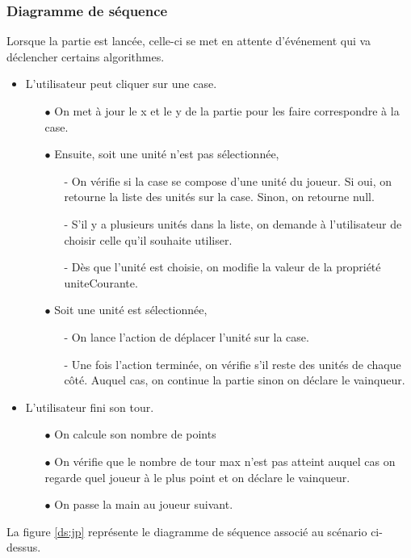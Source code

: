 \documentclass[a4paper,11pt]{article}
\begin{document}
\subsubsection{Diagramme de séquence}
Lorsque la partie est lancée, celle-ci se met en attente d'événement qui va déclencher certains algorithmes.
\begin{itemize}
\item L'utilisateur peut cliquer sur une case.
	\begin{itemize}
	\item[$\bullet$] On met à jour le x et le y de la partie pour les faire correspondre à la case.
	\item[$\bullet$] Ensuite, soit une unité n'est pas sélectionnée,
		\begin{itemize}
		\item[-] On vérifie si la case se compose d'une unité du joueur. Si oui, on retourne la liste des unités sur la case. Sinon, on retourne null.
		\item[-] S'il y a plusieurs unités dans la liste, on demande à l'utilisateur de choisir celle qu'il souhaite utiliser.
		\item[-] Dès que l'unité est choisie, on modifie la valeur de la propriété uniteCourante.
		\end{itemize}
	\item[$\bullet$] Soit une unité est sélectionnée,
		\begin{itemize}
		\item[-] On lance l'action de déplacer l'unité sur la case. 
		\item[-] Une fois l'action terminée, on vérifie s'il reste des unités de chaque côté. Auquel cas, on continue la partie sinon on déclare le vainqueur.
		\end{itemize}
	\end{itemize}
\item L'utilisateur fini son tour.
	\begin{itemize}
	\item[$\bullet$] On calcule son nombre de points
	\item[$\bullet$] On vérifie que le nombre de tour max n'est pas atteint auquel cas on regarde quel joueur à le plus point et on déclare le vainqueur.
	\item[$\bullet$] On passe la main au joueur suivant.
	\end{itemize}
\end{itemize}
La figure \ref{ds:jp} représente le diagramme de séquence associé au scénario ci-dessus.
\end{document}
